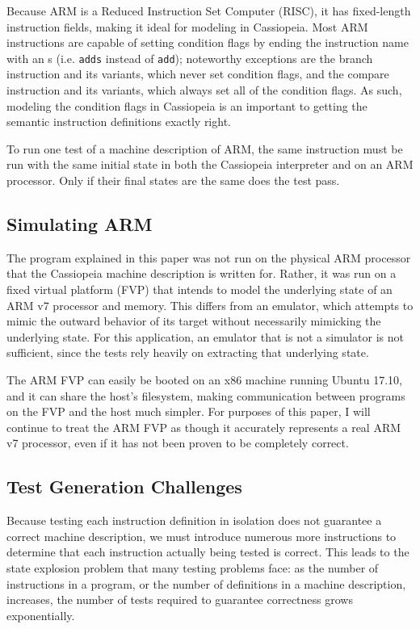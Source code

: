 \documentclass[letterpaper,12pt]{article}
\begin{document}
Because ARM is a Reduced Instruction Set Computer (RISC), it has fixed-length instruction fields, making it ideal for modeling in Cassiopeia. Most ARM instructions are capable of setting condition flags by ending the instruction name with an s (i.e. \texttt{adds} instead of \texttt{add}); noteworthy exceptions are the branch instruction and its variants, which never set condition flags, and the compare instruction and its variants, which always set all of the condition flags. As such, modeling the condition flags in Cassiopeia is an important to getting the semantic instruction definitions exactly right.

To run one test of a machine description of ARM, the same instruction must be run with the same initial state in both the Cassiopeia interpreter and on an ARM processor. Only if their final states are the same does the test pass.

\subsection{Simulating ARM}

The program explained in this paper was not run on the physical ARM processor that the Cassiopeia machine description is written for. Rather, it was run on a fixed virtual platform (FVP) that intends to model the underlying state of an ARM v7 processor and memory\cite{FVP}. This differs from an emulator, which attempts to mimic the outward behavior of its target without necessarily mimicking the underlying state. For this application, an emulator that is not a simulator is not sufficient, since the tests rely heavily on extracting that underlying state.

The ARM FVP can easily be booted on an x86 machine running Ubuntu 17.10, and it can share the host's filesystem, making communication between programs on the FVP and the host much simpler. For purposes of this paper, I will continue to treat the ARM FVP as though it accurately represents a real ARM v7 processor, even if it has not been proven to be completely correct.

\subsection{Test Generation Challenges}

Because testing each instruction definition in isolation does not guarantee a correct machine description, we must introduce numerous more instructions to determine that each instruction actually being tested is correct. This leads to the state explosion problem that many testing problems face: as the number of instructions in a program, or the number of definitions in a machine description, increases, the number of tests required to guarantee correctness grows exponentially\cite{Klee}.
\end{document}
